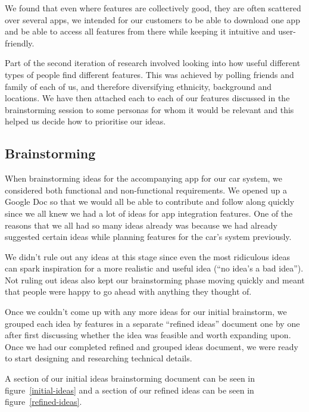 \documentclass{article}
\begin{document}
We found that even where features are collectively good, they are often scattered over several apps, we intended for our customers to be able to download one app and be able to access all features from there while keeping it intuitive and user-friendly.

Part of the second iteration of research involved looking into how useful different types of people find different features. This was achieved by polling friends and family of each of us, and therefore diversifying ethnicity, background and locations. We have then attached each to each of our features discussed in the brainstorming session to some personas for whom it would be relevant and this helped us decide how to prioritise our ideas.

\subsection{Brainstorming}\label{ssec:app-brainstorming} %
When brainstorming ideas for the accompanying app for our car system, we considered both functional and non-functional requirements. We opened up a Google Doc so that we would all be able to contribute and follow along quickly since we all knew we had a lot of ideas for app integration features. One of the reasons that we all had so many ideas already was because we had already suggested certain ideas while planning features for the car's system previously.

We didn't rule out any ideas at this stage since even the most ridiculous ideas can spark inspiration for a more realistic and useful idea (``no idea's a bad idea''). Not ruling out ideas also kept our brainstorming phase moving quickly and meant that people were happy to go ahead with anything they thought of.

Once we couldn't come up with any more ideas for our initial brainstorm, we grouped each idea by features in a separate ``refined ideas'' document one by one after first discussing whether the idea was feasible and worth expanding upon. Once we had our completed refined and grouped ideas document, we were ready to start designing and researching technical details.

A section of our initial ideas brainstorming document can be seen in figure~\ref{initial-ideas} and a section of our refined ideas can be seen in figure~\ref{refined-ideas}.
\end{document}
